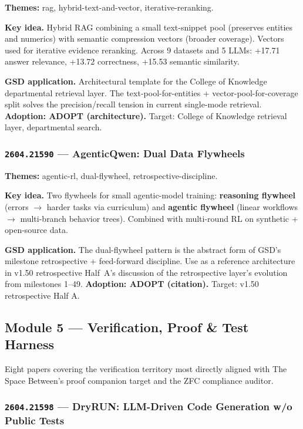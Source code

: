 \documentclass[11pt,letterpaper]{article}
\newcommand{\arxivid}[1]{\texttt{\textcolor{accent}{#1}}}
\newcommand{\paperhead}[2]{\noindent\textbf{\sffamily\textcolor{secondary}{#1}} \textemdash{} #2}
\begin{document}
\paperhead{Themes:}{rag, hybrid-text-and-vector, iterative-reranking.}

\textbf{Key idea.} Hybrid RAG combining a small text-snippet pool (preserves entities and numerics) with semantic compression vectors (broader coverage). Vectors used for iterative evidence reranking. Across 9 datasets and 5 LLMs: +17.71 answer relevance, +13.72 correctness, +15.53 semantic similarity.

\textbf{GSD application.} Architectural template for the College of Knowledge departmental retrieval layer. The text-pool-for-entities + vector-pool-for-coverage split solves the precision/recall tension in current single-mode retrieval. \textbf{Adoption: ADOPT (architecture).} Target: College of Knowledge retrieval layer, departmental search.

\subsubsection{\arxivid{2604.21590} --- AgenticQwen: Dual Data Flywheels}

\paperhead{Themes:}{agentic-rl, dual-flywheel, retrospective-discipline.}

\textbf{Key idea.} Two flywheels for small agentic-model training: \textbf{reasoning flywheel} (errors $\to$ harder tasks via curriculum) and \textbf{agentic flywheel} (linear workflows $\to$ multi-branch behavior trees). Combined with multi-round RL on synthetic + open-source data.

\textbf{GSD application.} The dual-flywheel pattern is the abstract form of GSD's milestone retrospective + feed-forward discipline. Use as a reference architecture in v1.50 retrospective Half~A's discussion of the retrospective layer's evolution from milestones 1--49. \textbf{Adoption: ADOPT (citation).} Target: v1.50 retrospective Half A.

\subsection{Module 5 --- Verification, Proof \& Test Harness}

Eight papers covering the verification territory most directly aligned with The Space Between's proof companion target and the ZFC compliance auditor.

\subsubsection{\arxivid{2604.21598} --- DryRUN: LLM-Driven Code Generation w/o Public Tests}
\end{document}
